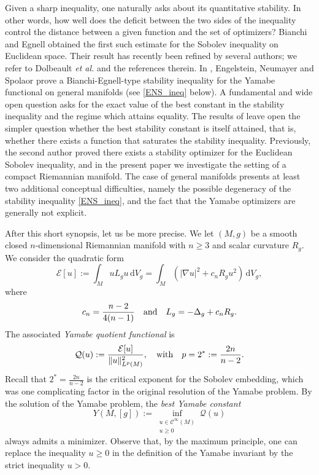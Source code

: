 \documentclass[reqno,11pt]{amsart}
\numberwithin{equation}{section}
\theoremstyle{definition}
\theoremstyle{remark}
\newcommand{\ud}{\,\mathrm{d}}
\begin{document}
Given a sharp inequality, one naturally asks about its quantitative 
stability. In other words, how well does the deficit between the two sides of the 
inequality control the distance between a given function and the set of optimizers? 
Bianchi and Egnell \cite{BE} obtained the first such estimate for the Sobolev 
inequality on Euclidean space. Their 
result has recently
been refined by several authors; we refer to 
Dolbeault {\it et al.} \cite{DEFFL} and the references therein. In \cite{ENS}, 
Engelstein, Neumayer and Spolaor prove a Bianchi-Egnell-type stability inequality for the 
Yamabe functional on general manifolds (see \eqref{ENS_ineq} below). A fundamental and 
wide open question asks for the exact value of the best constant in the stability 
inequality and the regime which attains equality. The results of \cite{BE, ENS, DEFFL} 
leave open the simpler question whether the best stability constant is itself attained, 
that is, whether there exists a 
function that saturates the stability inequality. Previously, the second 
author \cite{arXiv:2211.14185} proved there exists a stability optimizer 
for the Euclidean Sobolev inequality, and in the present paper we 
investigate the setting of a compact Riemannian manifold. The case of 
general manifolds presents at least two additional conceptual difficulties, namely the possible 
degeneracy of the stability inequality \eqref{ENS_ineq}, and the fact that the Yamabe optimizers 
are generally not explicit.

\medskip
{}
After this short synopsis, let us be more precise.
We let $(M,g)$ be a smooth closed $n$-dimensional Riemannian manifold with $n \geqslant 3$ and 
scalar curvature $R_g$. We consider the quadratic form
\[
\mathcal{E}[u] := \int_M u L_g u \ud V_g = \int_M \left(|\nabla u|^2 + c_n R_g u^2\right) \ud V_g,
\]
where
\[
c_n = \frac{n-2}{4(n-1)} \quad {\rm and} \quad L_g = -\Delta_g + c_n R_g.
\]
The associated \emph{Yamabe quotient functional} is
\[
\mathcal{Q}(u) := \frac{\mathcal{E}[u]}{\|u\|_{L^{p}(M)}^2},
\quad {\rm with} \quad p = 2^*:= \frac{2n}{n-2}.
\]
Recall that $2^*=\tfrac{2n}{n-2}$ is the critical exponent for the Sobolev embedding, which 
was one complicating factor in the original resolution of the Yamabe problem.
By the solution of the Yamabe problem, the \emph{best Yamabe constant}
\[
Y(M,[g]) := \inf_{\substack{u \in \mathcal{C}^\infty(M)\\ u \geqslant 0}}\mathcal{Q}(u)
\]
always admits a minimizer. 
Observe that, by the maximum principle, one can replace the 
inequality $u \geqslant 0$ in the definition of the Yamabe invariant by the strict 
inequality $u>0$. 
\end{document}
